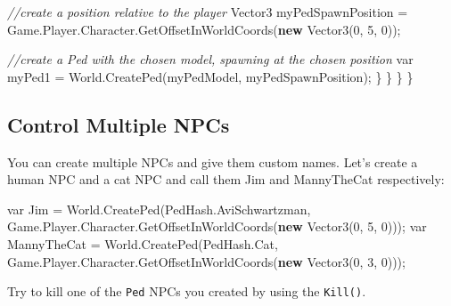 \documentclass[
  openany]{book}
\newenvironment{Shaded}{\begin{snugshade}}{\end{snugshade}}
\newcommand{\CommentTok}[1]{\textcolor[rgb]{0.56,0.35,0.01}{\textit{#1}}}
\newcommand{\DataTypeTok}[1]{\textcolor[rgb]{0.13,0.29,0.53}{#1}}
\newcommand{\DecValTok}[1]{\textcolor[rgb]{0.00,0.00,0.81}{#1}}
\newcommand{\FunctionTok}[1]{\textcolor[rgb]{0.00,0.00,0.00}{#1}}
\newcommand{\KeywordTok}[1]{\textcolor[rgb]{0.13,0.29,0.53}{\textbf{#1}}}
\newcommand{\NormalTok}[1]{#1}
\begin{document}
\begin{Shaded}
\begin{Highlighting}[]
                    \CommentTok{//create a position relative to the player}
\NormalTok{                    Vector3 myPedSpawnPosition = Game.}\FunctionTok{Player}\NormalTok{.}\FunctionTok{Character}\NormalTok{.}\FunctionTok{GetOffsetInWorldCoords}\NormalTok{(}\KeywordTok{new} \FunctionTok{Vector3}\NormalTok{(}\DecValTok{0}\NormalTok{, }\DecValTok{5}\NormalTok{, }\DecValTok{0}\NormalTok{));}
    
                    \CommentTok{//create a Ped with the chosen model, spawning at the chosen position}
                    \DataTypeTok{var}\NormalTok{ myPed1 = World.}\FunctionTok{CreatePed}\NormalTok{(myPedModel, myPedSpawnPosition); }
\NormalTok{            \}}
\NormalTok{        \}}
\NormalTok{    \}}
\NormalTok{\}}
\end{Highlighting}
\end{Shaded}

\hypertarget{control-multiple-npcs}{%
\subsection*{Control Multiple NPCs}\label{control-multiple-npcs}}

You can create multiple NPCs and give them custom names. Let's create a human NPC and a cat NPC and call them Jim and MannyTheCat respectively:

\begin{Shaded}
\begin{Highlighting}[]
\DataTypeTok{var}\NormalTok{ Jim = World.}\FunctionTok{CreatePed}\NormalTok{(PedHash.}\FunctionTok{AviSchwartzman}\NormalTok{, Game.}\FunctionTok{Player}\NormalTok{.}\FunctionTok{Character}\NormalTok{.}\FunctionTok{GetOffsetInWorldCoords}\NormalTok{(}\KeywordTok{new} \FunctionTok{Vector3}\NormalTok{(}\DecValTok{0}\NormalTok{, }\DecValTok{5}\NormalTok{, }\DecValTok{0}\NormalTok{)));}
\DataTypeTok{var}\NormalTok{ MannyTheCat = World.}\FunctionTok{CreatePed}\NormalTok{(PedHash.}\FunctionTok{Cat}\NormalTok{, Game.}\FunctionTok{Player}\NormalTok{.}\FunctionTok{Character}\NormalTok{.}\FunctionTok{GetOffsetInWorldCoords}\NormalTok{(}\KeywordTok{new} \FunctionTok{Vector3}\NormalTok{(}\DecValTok{0}\NormalTok{, }\DecValTok{3}\NormalTok{, }\DecValTok{0}\NormalTok{)));}
\end{Highlighting}
\end{Shaded}

Try to kill one of the \texttt{Ped} NPCs you created by using the \texttt{Kill()}.
\end{document}
